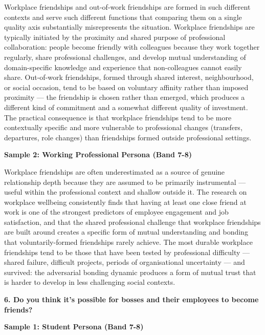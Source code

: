Workplace friendships and out-of-work friendships are formed in such different contexts and serve such different functions that comparing them on a single quality axis substantially misrepresents the situation. Workplace friendships are typically initiated by the proximity and shared purpose of professional collaboration: people become friendly with colleagues because they work together regularly, share professional challenges, and develop mutual understanding of domain-specific knowledge and experience that non-colleagues cannot easily share. Out-of-work friendships, formed through shared interest, neighbourhood, or social occasion, tend to be based on voluntary affinity rather than imposed proximity — the friendship is chosen rather than emerged, which produces a different kind of commitment and a somewhat different quality of investment. The practical consequence is that workplace friendships tend to be more contextually specific and more vulnerable to professional changes (transfers, departures, role changes) than friendships formed outside professional settings.

\textbf{Sample 2: Working Professional Persona (Band 7-8)}

Workplace friendships are often underestimated as a source of genuine relationship depth because they are assumed to be primarily instrumental — useful within the professional context and shallow outside it. The research on workplace wellbeing consistently finds that having at least one close friend at work is one of the strongest predictors of employee engagement and job satisfaction, and that the shared professional challenge that workplace friendships are built around creates a specific form of mutual understanding and bonding that voluntarily-formed friendships rarely achieve. The most durable workplace friendships tend to be those that have been tested by professional difficulty — shared failure, difficult projects, periods of organisational uncertainty — and survived: the adversarial bonding dynamic produces a form of mutual trust that is harder to develop in less challenging social contexts.

\separator

\begin{ieltsquestion}
\textbf{6. Do you think it's possible for bosses and their employees to become friends?}
\end{ieltsquestion}
\textbf{Sample 1: Student Persona (Band 7-8)}

